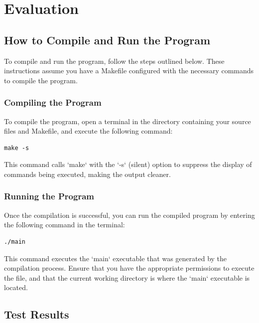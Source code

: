 \documentclass[12pt, a4paper]{article}
\begin{document}
\section{Evaluation}

\subsection{How to Compile and Run the Program}
To compile and run the program, follow the steps outlined below. These
instructions assume you have a Makefile configured with the necessary commands
to compile the program.

\subsubsection*{Compiling the Program}
To compile the program, open a terminal in the directory containing your source
files and Makefile, and execute the following command:
\begin{verbatim}
make -s
\end{verbatim}
This command calls `make` with the `-s` (silent) option to suppress the display
of commands being executed, making the output cleaner.

\subsubsection*{Running the Program}
Once the compilation is successful, you can run the compiled program by entering
the following command in the terminal:
\begin{verbatim}
./main
\end{verbatim}
This command executes the `main` executable that was generated by the
compilation process. Ensure that you have the appropriate permissions to execute
the file, and that the current working directory is where the `main` executable
is located.


\subsection{Test Results}
\end{document}
